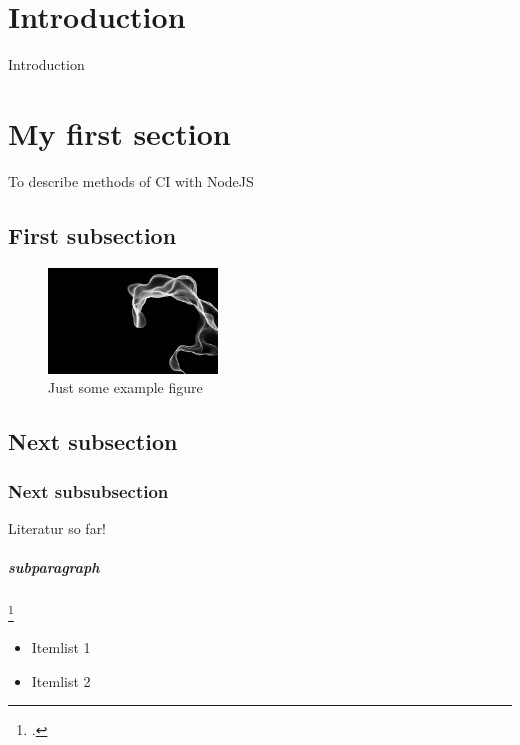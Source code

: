 \section{Introduction}
Introduction

\newpage

\section{My first section}
\label{section:Introduction}
To describe methods of CI with NodeJS

\subsection{First subsection}

\begin{figure}[h!]
  \centering
      \includegraphics[width=0.4\textwidth]{images/Perlin-Coherent.png}
  \caption{Just some example figure}
\end{figure}

\subsection{Next subsection}

\subsubsection{Next subsubsection}

Literatur so far!

\cite{meyer2014continuous}
\cite{schaefer2013continuous}
\cite{humble2010continuous}
\cite{fowler2006continuous}
\cite{fowler2012continuous}
\cite{duvall2007continuous}
\cite{stolberg2009enabling}
\cite{humble2010continuous}
\cite{staahl2014modeling}
\cite{maurer2002extreme}
\cite{hansen2015continuous}
\cite{pasquali2015deploying}
\cite{turnbull2014docker}
\cite{raj2015learning}
\cite{astels2003test}
\cite{beck2003test}
\cite{maximilien2003assessing}
\cite{janzen2005test}

\subparagraph{subparagraph}
\footcite{meyer2014continuous}

\begin{itemize}
  \item Itemlist 1
  \item Itemlist 2
\end{itemize} \cite{cranorplatform}

